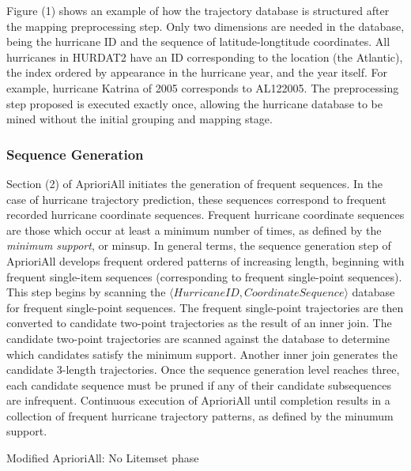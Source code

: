 \documentclass[12pt,conference]{IEEEtran}
\begin{document}
Figure (1) shows an example of how the trajectory database is structured after the mapping preprocessing step. Only two dimensions are needed in the database, being the hurricane ID and the sequence of latitude-longtitude coordinates. All hurricanes in HURDAT2 have an ID corresponding to the location (the Atlantic), the index ordered by appearance in the hurricane year, and the year itself. For example, hurricane Katrina of 2005 corresponds to AL122005. The preprocessing step proposed is executed exactly once, allowing the hurricane database to be mined without the initial grouping and mapping stage.

\subsubsection{Sequence Generation}

Section (2) of AprioriAll initiates the generation of frequent sequences. In the case of hurricane trajectory prediction, these sequences correspond to frequent recorded hurricane coordinate sequences. Frequent hurricane coordinate sequences are those which occur at least a minimum number of times, as defined by the \textit{minimum support}, or minsup. In general terms, the sequence generation step of AprioriAll develops frequent ordered patterns of increasing length, beginning with frequent single-item sequences (corresponding to frequent single-point sequences). This step begins by scanning the $\langle HurricaneID, CoordinateSequence\rangle$ database for frequent single-point sequences. The frequent single-point trajectories are then converted to candidate two-point trajectories as the result of an inner join. The candidate two-point trajectories are scanned against the database to determine which candidates satisfy the minimum support. Another inner join generates the candidate 3-length trajectories. Once the sequence generation level reaches three, each candidate sequence must be pruned if any of their candidate subsequences are infrequent. Continuous execution of AprioriAll until completion results in a collection of frequent hurricane trajectory patterns, as defined by the minumum support.

\begin{algorithm}[H]
  \caption{Modified AprioriAll: No Litemset phase}
  \label{aprioriall_for_hurricanes}
  \begin{algorithmic}[1]
    \EndFor
  \EndFor
  \end{algorithmic}
\end{algorithm}
\end{document}
